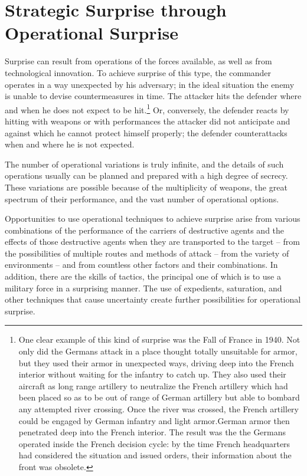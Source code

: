 \section{Strategic Surprise through Operational Surprise}
Surprise can result from operations of the forces available, as well as from technological innovation. To achieve surprise of this type, the commander operates in a way unexpected by his adversary; in the ideal situation the enemy is unable to devise countermeasures in time. The attacker hits the defender where and when he does not expect to be hit.\footnote{One clear example of this kind of surprise was the Fall of France in 1940. Not only did the Germans attack in a place thought totally unsuitable for armor, but they used their armor in unexpected ways, driving deep into the French interior without waiting for the infantry to catch up. They also used their aircraft as long range artillery to neutralize the French artillery which had been placed so as to be out of range of German artillery but able to bombard any attempted river crossing. Once the river was crossed, the French artillery could be engaged by German infantry and light armor.German armor then penetrated deep into the French interior. The result was the the Germans operated inside the French decision cycle: by the time French headquarters had considered the situation and issued orders, their information about the front was obsolete.}
Or, conversely, the defender reacts by hitting with weapons or with performances the attacker did not anticipate and against which he cannot protect himself properly; the defender counterattacks when and where he is not expected.

The number of operational variations is truly infinite, and the details of such operations usually can be planned and prepared with a high degree of secrecy. These variations are possible because of the multiplicity of weapons, the great spectrum of their performance, and the vast number of operational options.

Opportunities to use operational techniques to achieve surprise arise from various combinations of the performance of the carriers of destructive agents and the effects of those destructive agents when they are transported to the target -- from the possibilities of multiple routes and methods of attack -- from the variety of environments -- and from countless other factors and their combinations. In addition, there are the skills of tactics, the principal one of which is to use a military force in a surprising manner. The use of expedients, saturation, and other techniques that cause uncertainty create further possibilities for operational surprise.

